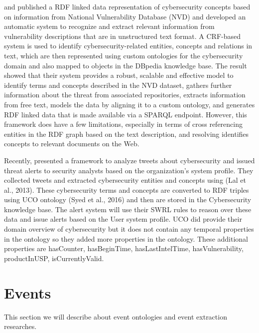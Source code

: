 \cite{joshi2013extracting} and \cite{joshi2013linked} published a RDF linked data representation of cybersecurity concepts  based on information from National Vulnerability Database (NVD) and developed an automatic system to recognize and extract relevant information from vulnerability descriptions that are in unstructured text format. A CRF-based system is used to identify cybersecurity-related entities, concepts and relations in text, which are then represented using custom ontologies for the cybersecurity domain and also mapped to objects in the DBpedia knowledge base. The result showed that their system provides a robust, scalable and effective model to identify terms and concepts described in the NVD dataset, gathers further information about the threat from associated repositories, extracts information from free text, models the data by aligning it to a custom ontology, and generates RDF linked data that is made available via a SPARQL endpoint. However, this framework does have a few limitations, especially in terms of cross referencing entities in the RDF graph based on the text description, and resolving identiﬁes concepts to relevant documents on the Web.

Recently, \cite{mittal2016cybertwitter} presented a framework to analyze tweets about cybersecurity and issued threat alerts to security analysts based on the organization’s system profile. They collected tweets and extracted cybersecurity entities and concepts using (Lal et al., 2013). These cybersecurity terms and concepts are converted to RDF triples using UCO ontology (Syed et al., 2016) and then are stored in the Cybersecurity knowledge base. The alert system will use their SWRL rules to reason over these data and issue alerts based on the User system profile. UCO did provide their domain overview of cybersecurity but it does not contain any temporal properties in the ontology so they added more properties in the ontology. These additional properties are hasCounter, hasBeginTime, hasLastIntelTime, hasVulnerability, productInUSP, isCurrentlyValid. 


\section{Events}
\label{events}
This section we will describe about event ontologies and event extraction researches.

